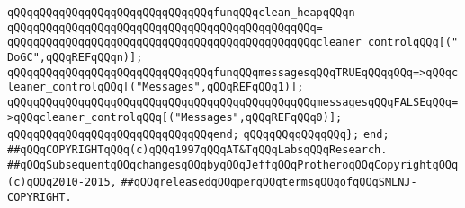\newline
\verb|qQQqqQQqqQQqqQQqqQQqqQQqqQQqqQQqfunqQQqclean_heapqQQqn|\newline
\verb|qQQqqQQqqQQqqQQqqQQqqQQqqQQqqQQqqQQqqQQqqQQqqQQq=|\newline
\verb|qQQqqQQqqQQqqQQqqQQqqQQqqQQqqQQqqQQqqQQqqQQqqQQqcleaner_controlqQQq[("DoGC",qQQqREFqQQqn)];|\newline
\newline
\verb|qQQqqQQqqQQqqQQqqQQqqQQqqQQqqQQqfunqQQqmessagesqQQqTRUEqQQqqQQq=>qQQqcleaner_controlqQQq[("Messages",qQQqREFqQQq1)];|\newline
\verb|qQQqqQQqqQQqqQQqqQQqqQQqqQQqqQQqqQQqqQQqqQQqqQQqmessagesqQQqFALSEqQQq=>qQQqcleaner_controlqQQq[("Messages",qQQqREFqQQq0)];|\newline
\verb|qQQqqQQqqQQqqQQqqQQqqQQqqQQqqQQqend;|\newline
\newline
\newline
\verb|qQQqqQQqqQQqqQQq};|\newline
\verb|end;|\newline
\newline
\newline
\newline
\verb|##qQQqCOPYRIGHTqQQq(c)qQQq1997qQQqAT&TqQQqLabsqQQqResearch.|\newline
\verb|##qQQqSubsequentqQQqchangesqQQqbyqQQqJeffqQQqProtheroqQQqCopyrightqQQq(c)qQQq2010-2015,|\newline
\verb|##qQQqreleasedqQQqperqQQqtermsqQQqofqQQqSMLNJ-COPYRIGHT.|\newline

